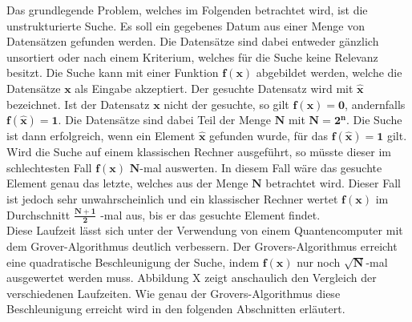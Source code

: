 Das grundlegende Problem, welches im Folgenden betrachtet wird, ist die unstrukturierte Suche. 
Es soll ein gegebenes Datum aus einer Menge von Datensätzen gefunden werden. 
Die Datensätze sind dabei entweder gänzlich unsortiert oder nach einem Kriterium, welches für die Suche keine Relevanz besitzt. 
Die Suche kann mit einer Funktion $\mathbf{f(x)}$ abgebildet werden, welche die Datensätze $\mathbf{x}$ als Eingabe akzeptiert. 
Der gesuchte Datensatz wird mit $\mathbf{\hat x}$ bezeichnet. Ist der Datensatz $\mathbf{x}$ nicht der gesuchte, so gilt $\mathbf{f(x) = 0}$, andernfalls $\mathbf{f(\hat x) = 1}$. 
Die Datensätze sind dabei Teil der Menge $\mathbf{N}$ mit $\mathbf{N = 2^n}$. Die Suche ist dann erfolgreich, wenn ein Element $\mathbf{\hat x}$ gefunden wurde, für das $\mathbf{f(\hat x) = 1}$ gilt.
\newline
\\
Wird die Suche auf einem klassischen Rechner ausgeführt, so müsste dieser im schlechtesten Fall $\mathbf{f(x)}$ $\mathbf{N}$-mal auswerten. 
In diesem Fall wäre das gesuchte Element genau das letzte, welches aus der Menge $\mathbf{N}$ betrachtet wird. 
Dieser Fall ist jedoch sehr unwahrscheinlich und ein klassischer Rechner wertet $\mathbf{f(x)}$ im Durchschnitt $\mathbf{\frac{N+1}{2}}$ -mal aus, bis er das gesuchte Element findet.
\\
Diese Laufzeit lässt sich unter der Verwendung von einem Quantencomputer mit dem Grover-Algorithmus deutlich verbessern. 
Der Grovers-Algorithmus erreicht eine quadratische Beschleunigung der Suche, indem $\mathbf{f(x)}$ nur noch $\mathbf{\sqrt{N}}$-mal ausgewertet werden muss. 
Abbildung X zeigt anschaulich den Vergleich der verschiedenen Laufzeiten. Wie genau der Grovers-Algorithmus diese Beschleunigung erreicht wird in den folgenden Abschnitten erläutert.